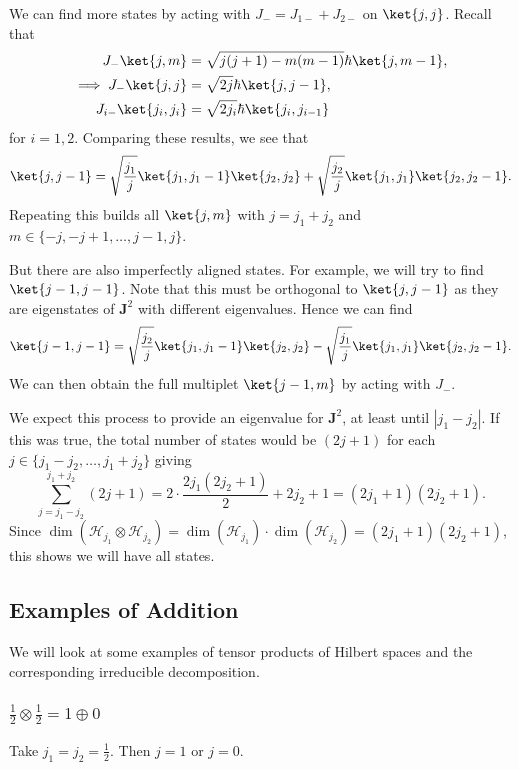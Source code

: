 \documentclass[12pt]{article}
\begin{document}
We can find more states by acting with $J_- = J_{1-} + J_{2-}$ on $\ket{j,j}$. Recall that
\begin{align*}
	J_-\ket{j,m} &= \sqrt{j(j+1)-m(m-1)} \hbar \ket{j,m-1}, \\
	\implies J_-\ket{j,j} &= \sqrt{2j} \hbar \ket{j,j-1}, \\
	J_{i-} \ket{j_{i}, j_i} &= \sqrt{2j_i} \hbar \ket{j_i, j_{i-1}}
\end{align*}
for $i = 1, 2$. Comparing these results, we see that
\[
	\ket{j,j-1} = \sqrt{\frac{j_1}{j}} \ket{j_1,j_1-1}\ket{j_2,j_2} + \sqrt{\frac{j_2}{j}} \ket{j_1,j_1}\ket{j_2,j_2-1}.
\]
Repeating this builds all $\ket{j, m}$ with $j = j_1 + j_2$ and $m \in \{-j, -j+1, \ldots, j-1, j\}$.

But there are also imperfectly aligned states. For example, we will try to find $\ket{j-1,j-1}$. Note that this must be orthogonal to $\ket{j, j-1}$ as they are eigenstates of $\mathbf{J}^2$ with different eigenvalues. Hence we can find
\[
	\ket{j-1,j-1}= \sqrt{\frac{j_2}{j}} \ket{j_1,j_1-1}\ket{j_2,j_2} - \sqrt{\frac{j_1}{j}}\ket{j_1,j_1}\ket{j_2,j_2-1}.
\]
We can then obtain the full multiplet $\ket{j-1,m}$ by acting with $J_-$.

We expect this process to provide an eigenvalue for $\mathbf{J}^2$, at least until $|j_1 - j_2|$. If this was true, the total number of states would be $(2j+1)$ for each $j \in \{j_1 - j_2, \ldots, j_1+j_2\}$ giving
\[
\sum_{j = j_1 - j_2}^{j_1+j_2} (2j+1) = 2 \cdot \frac{2j_1(2j_2+1)}{2} + 2j_2 + 1 = (2j_1 +1)(2j_2+1).
\]
Since $\dim(\mathcal{H}_{j_1} \otimes \mathcal{H}_{j_2}) = \dim(\mathcal{H}_{j_1}) \cdot \dim(\mathcal{H}_{j_2}) = (2j_1+1)(2j_2+1)$, this shows we will have all states.


\subsection{Examples of Addition}
\label{sub:ex_add}

We will look at some examples of tensor products of Hilbert spaces and the corresponding irreducible decomposition.

\subsubsection{$\frac{1}{2} \otimes \frac{1}{2} = 1 \oplus 0$}
\label{subsub:add_ex_1}

Take $j_1 = j_2 = \frac{1}{2}$. Then $j = 1$ or $j = 0$.
\end{document}
